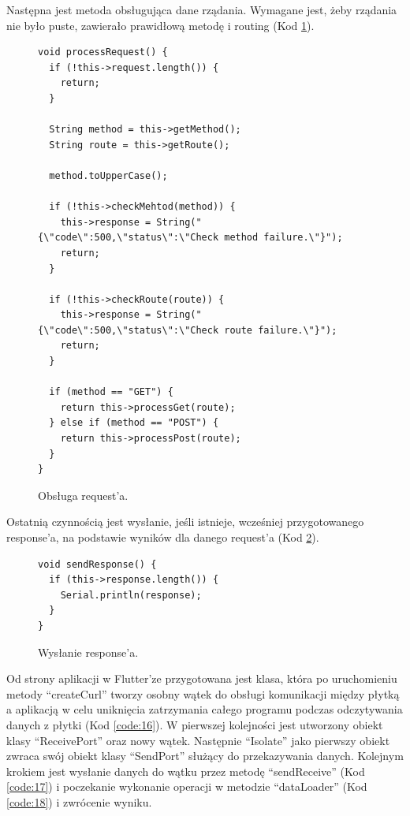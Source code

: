 \documentclass[a4paper,twoside,12pt]{book}
\begin{document}
\newpage

Następna jest metoda obsługująca dane rządania. Wymagane jest, żeby rządania nie było puste, zawierało prawidłową metodę i routing (Kod \ref{code:14}).

\begin{figure}[H]
   \centering
   \footnotesize
   \begin{lstlisting}
void processRequest() {
  if (!this->request.length()) {
    return;
  }

  String method = this->getMethod();
  String route = this->getRoute();

  method.toUpperCase();

  if (!this->checkMehtod(method)) {
    this->response = String("{\"code\":500,\"status\":\"Check method failure.\"}");
    return;
  }

  if (!this->checkRoute(route)) {
    this->response = String("{\"code\":500,\"status\":\"Check route failure.\"}");
    return;
  }

  if (method == "GET") {
    return this->processGet(route);
  } else if (method == "POST") {
    return this->processPost(route);
  }
}
   \end{lstlisting}
   \caption{Obsługa request'a.}
   \label{code:14}
\end{figure}

\newpage

Ostatnią czynnością jest wysłanie, jeśli istnieje, wcześniej przygotowanego response'a, na podstawie wyników dla danego request'a (Kod \ref{code:15}).

\begin{figure}[H]
   \centering
   \footnotesize
   \begin{lstlisting}
void sendResponse() {
  if (this->response.length()) {
    Serial.println(response);
  }
}
   \end{lstlisting}
   \caption{Wysłanie response'a.}
   \label{code:15}
\end{figure}

Od strony aplikacji w Flutter'ze przygotowana jest klasa, która po uruchomieniu metody ``createCurl'' tworzy osobny wątek do obsługi komunikacji między płytką a aplikacją w celu uniknięcia zatrzymania całego programu podczas odczytywania danych z płytki (Kod \ref{code:16}). W pierwszej kolejności jest utworzony obiekt klasy ``ReceivePort'' oraz nowy wątek. Następnie ``Isolate'' jako pierwszy obiekt zwraca swój obiekt klasy ``SendPort'' służący do przekazywania danych. Kolejnym krokiem jest wysłanie danych do wątku przez metodę ``sendReceive'' (Kod \ref{code:17}) i poczekanie wykonanie operacji w metodzie ``dataLoader'' (Kod \ref{code:18}) i zwrócenie wyniku.
\end{document}
